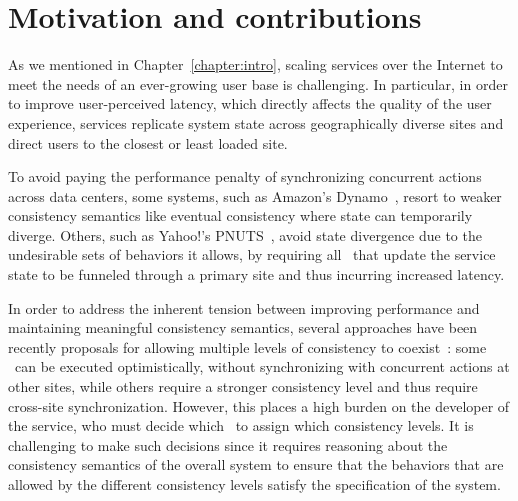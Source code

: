 \section{Motivation and contributions}
\label{ch:redblue:sect:motiv}
As we mentioned in Chapter~\ref{chapter:intro}, scaling services over the Internet to meet the needs of an
ever-growing user base is challenging. In particular, in order to improve
user-perceived latency, which directly affects the quality of the user
experience, services replicate system state across geographically
diverse sites and direct users to the closest or least loaded site.


To avoid paying the performance penalty of synchronizing concurrent
actions across data centers, some systems, such as Amazon's
Dynamo~\cite{Decandia2007Dynamo}, resort to weaker consistency semantics
like eventual consistency where state can temporarily diverge.
Others, such as Yahoo!'s PNUTS~\cite{Cooper2008PNUTS}, avoid state
divergence due to the undesirable sets of behaviors it allows, by
requiring all \operations\ that update the service state to be
funneled through a primary site and thus incurring increased latency.

In order to address the inherent tension between improving performance and
maintaining meaningful consistency semantics, several approaches have been recently proposals 
for allowing multiple
  levels of consistency to
  coexist~\cite{Ladin1992LazyReplication,Sovran2011PSI,Singh2009Zeno}: some
  \operations\ can be executed optimistically, without synchronizing
  with concurrent actions at other sites, while others require a
  stronger consistency level and thus require cross-site
  synchronization. However, this places a high burden on the developer
  of the service, who must decide which \operations\ to assign which
  consistency levels. It is challenging to make such decisions since it requires reasoning about the consistency
  semantics of the overall system to ensure that the behaviors
  that are allowed by the different consistency levels satisfy the specification
  of the system.



